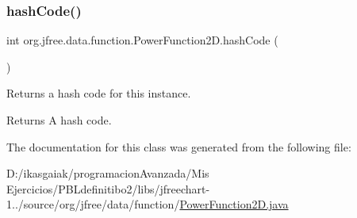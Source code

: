 \mbox{\label{classorg_1_1jfree_1_1data_1_1function_1_1_power_function2_d_a84a9d7312e196d03a8dd83b90c144a81}} 
\subsubsection{\texorpdfstring{hash\+Code()}{hashCode()}}
{\footnotesize\ttfamily int org.\+jfree.\+data.\+function.\+Power\+Function2\+D.\+hash\+Code (\begin{DoxyParamCaption}{ }\end{DoxyParamCaption})}

Returns a hash code for this instance.

\begin{DoxyReturn}{Returns}
A hash code. 
\end{DoxyReturn}


The documentation for this class was generated from the following file\+:\begin{DoxyCompactItemize}
\item 
D\+:/ikasgaiak/programacion\+Avanzada/\+Mis Ejercicios/\+P\+B\+Ldefinitibo2/libs/jfreechart-\/1../source/org/jfree/data/function/\mbox{\hyperlink{_power_function2_d_8java}{Power\+Function2\+D.\+java}}\end{DoxyCompactItemize}
